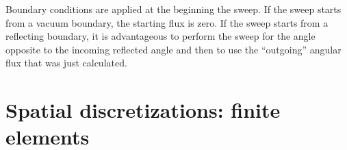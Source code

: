 \documentclass[11pt]{article}
\begin{document}
Boundary conditions are applied at the beginning the sweep. If the sweep starts
from a vacuum boundary, the starting flux is zero. If the sweep starts from a
reflecting boundary, it is advantageous to perform the sweep for the
angle opposite to the incoming reflected angle and then to use the ``outgoing''
angular flux that was just calculated.
\section{Spatial discretizations: finite elements}

\nocite{Lew1984}\nocite{Lar2007}


\end{document}
